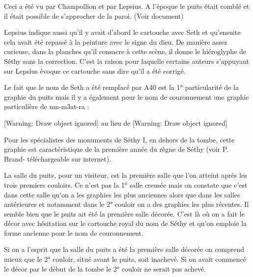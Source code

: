 \documentclass{article}
\begin{document}
Ceci a été vu par Champollion et par Lepsius. A l’époque le puits était
comblé et il était possible de s’approcher de la paroi. (Voir document)

Lepsius indique aussi qu’il y avait d’abord le cartouche avec Seth et
qu’ensuite cela avait été repassé à la peinture  avec le signe du dieu.
De manière assez curieuse, dans la planches qu’il consacre à cette
scène, il donne le hiéroglyphe de Séthy sans la correction. C’est la
raison pour laquelle certains auteurs s’appuyant sur Lepsius évoque ce
cartouche sans dire qu’il a été corrigé.

Le fait que le nom de Seth a été remplacé par A40 est la 1°
particularité de la graphie du puits mais il y a également pour le nom
de couronnement une graphie particulière de mn-m3at-ra  : 

[Warning: Draw object ignored]  au lieu  de  [Warning: Draw object
ignored]

\begin{figure}[htp]

\end{figure}
\begin{figure}[htp]

\end{figure}
Pour les spécialistes des monuments de Séthy I, en dehors de la tombe,
cette graphie est caractéristique de la première année du règne de
Séthy (voir P. Brand- téléchargeable sur internet). 

La salle du puits, pour un visiteur, est la première salle que l’on
atteint après les trois premiers couloirs. Ce n’est pas la 1° salle
creusée mais on constate que c’est dans cette salle qu’on a les
graphies les plus anciennes alors que dans les salles antérieures et
notamment dans le 2° couloir on a des graphies les plus récentes. Il
semble bien que le puits ait été la première salle décorée. C’est là où
on a fait le décor avec hésitation sur le cartouche royal du nom de
Séthy et qu’on emploie la forme ancienne pour le nom de couronnement.

Si on a l’esprit que la salle du puits a été la première salle décorée
on comprend mieux que le 2° couloir, situé avant le puits, soit
inachevé. Si on avait commencé le décor par le début de la tombe le 2°
couloir ne serait pas achevé.
\end{document}
